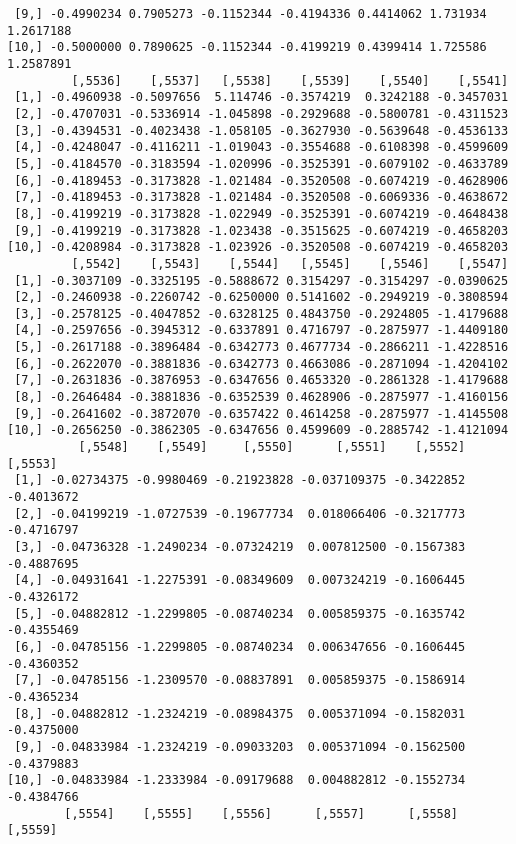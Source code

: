 \documentclass[
  letterpaper,
  DIV=11,
  numbers=noendperiod]{scrreprt}
\begin{document}
\begin{verbatim}
 [9,] -0.4990234 0.7905273 -0.1152344 -0.4194336 0.4414062 1.731934 1.2617188
[10,] -0.5000000 0.7890625 -0.1152344 -0.4199219 0.4399414 1.725586 1.2587891
         [,5536]    [,5537]   [,5538]    [,5539]    [,5540]    [,5541]
 [1,] -0.4960938 -0.5097656  5.114746 -0.3574219  0.3242188 -0.3457031
 [2,] -0.4707031 -0.5336914 -1.045898 -0.2929688 -0.5800781 -0.4311523
 [3,] -0.4394531 -0.4023438 -1.058105 -0.3627930 -0.5639648 -0.4536133
 [4,] -0.4248047 -0.4116211 -1.019043 -0.3554688 -0.6108398 -0.4599609
 [5,] -0.4184570 -0.3183594 -1.020996 -0.3525391 -0.6079102 -0.4633789
 [6,] -0.4189453 -0.3173828 -1.021484 -0.3520508 -0.6074219 -0.4628906
 [7,] -0.4189453 -0.3173828 -1.021484 -0.3520508 -0.6069336 -0.4638672
 [8,] -0.4199219 -0.3173828 -1.022949 -0.3525391 -0.6074219 -0.4648438
 [9,] -0.4199219 -0.3173828 -1.023438 -0.3515625 -0.6074219 -0.4658203
[10,] -0.4208984 -0.3173828 -1.023926 -0.3520508 -0.6074219 -0.4658203
         [,5542]    [,5543]    [,5544]   [,5545]    [,5546]    [,5547]
 [1,] -0.3037109 -0.3325195 -0.5888672 0.3154297 -0.3154297 -0.0390625
 [2,] -0.2460938 -0.2260742 -0.6250000 0.5141602 -0.2949219 -0.3808594
 [3,] -0.2578125 -0.4047852 -0.6328125 0.4843750 -0.2924805 -1.4179688
 [4,] -0.2597656 -0.3945312 -0.6337891 0.4716797 -0.2875977 -1.4409180
 [5,] -0.2617188 -0.3896484 -0.6342773 0.4677734 -0.2866211 -1.4228516
 [6,] -0.2622070 -0.3881836 -0.6342773 0.4663086 -0.2871094 -1.4204102
 [7,] -0.2631836 -0.3876953 -0.6347656 0.4653320 -0.2861328 -1.4179688
 [8,] -0.2646484 -0.3881836 -0.6352539 0.4628906 -0.2875977 -1.4160156
 [9,] -0.2641602 -0.3872070 -0.6357422 0.4614258 -0.2875977 -1.4145508
[10,] -0.2656250 -0.3862305 -0.6347656 0.4599609 -0.2885742 -1.4121094
          [,5548]    [,5549]     [,5550]      [,5551]    [,5552]    [,5553]
 [1,] -0.02734375 -0.9980469 -0.21923828 -0.037109375 -0.3422852 -0.4013672
 [2,] -0.04199219 -1.0727539 -0.19677734  0.018066406 -0.3217773 -0.4716797
 [3,] -0.04736328 -1.2490234 -0.07324219  0.007812500 -0.1567383 -0.4887695
 [4,] -0.04931641 -1.2275391 -0.08349609  0.007324219 -0.1606445 -0.4326172
 [5,] -0.04882812 -1.2299805 -0.08740234  0.005859375 -0.1635742 -0.4355469
 [6,] -0.04785156 -1.2299805 -0.08740234  0.006347656 -0.1606445 -0.4360352
 [7,] -0.04785156 -1.2309570 -0.08837891  0.005859375 -0.1586914 -0.4365234
 [8,] -0.04882812 -1.2324219 -0.08984375  0.005371094 -0.1582031 -0.4375000
 [9,] -0.04833984 -1.2324219 -0.09033203  0.005371094 -0.1562500 -0.4379883
[10,] -0.04833984 -1.2333984 -0.09179688  0.004882812 -0.1552734 -0.4384766
        [,5554]    [,5555]    [,5556]      [,5557]      [,5558]    [,5559]

\end{verbatim}
\end{document}
